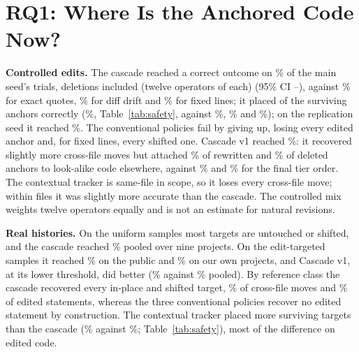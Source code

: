 \section{RQ1: Where Is the Anchored Code Now?}\label{sec:location}



\textbf{Controlled edits.} The cascade reached a correct outcome on \casCorrect\% of the main seed's trials, deletions included (twelve operators of \nPerOp{} each) (95\% CI \casLo--\casHi), against \qeCorrect\% for exact quotes, \ddCorrect\% for diff drift and \lnCorrect\% for fixed lines; it placed \smCtlCasPlaceK{} of the \smCtlCasPlaceN{} surviving anchors correctly (\smCtlCasPlacePct\%, Table~\ref{tab:safety}, against \smCtlQuotePlacePct\%, \smCtlDriftPlacePct\% and \smCtlLinePlacePct\%); on the replication seed it reached \casRep\%. The conventional policies fail by giving up, losing every edited anchor and, for fixed lines, every shifted one. Cascade v1 reached \voneCorrect\%: it recovered slightly more cross-file moves but attached \voneWrongRewrite\% of rewritten and \voneWrongDeleteBlock\% of deleted anchors to look-alike code elsewhere, against \casWrongRewrite\% and \casWrongDeleteBlock\% for the final tier order. The contextual tracker is same-file in scope, so it loses every cross-file move; within files it was slightly more accurate than the cascade. The controlled mix weights twelve operators equally and is not an estimate for natural revisions.

\textbf{Real histories.} On the uniform samples most targets are untouched or shifted, and the cascade reached \rUCas\% pooled over nine projects. On the edit-targeted samples it reached \rOssTCas\% on the public and \rOwnTCas\% on our own projects, and Cascade v1, at its lower threshold, did better (\rTVone\% against \rTCas\% pooled). By reference class the cascade recovered every in-place and shifted target, \rClsMovedFileCas\% of cross-file moves and \rClsEditedCas\% of edited statements, whereas the three conventional policies recover no edited statement by construction. The contextual tracker placed more surviving targets than the cascade (\smRealTrkPlacePct\% against \smRealCasPlacePct\%; Table~\ref{tab:safety}), most of the difference on edited code.

